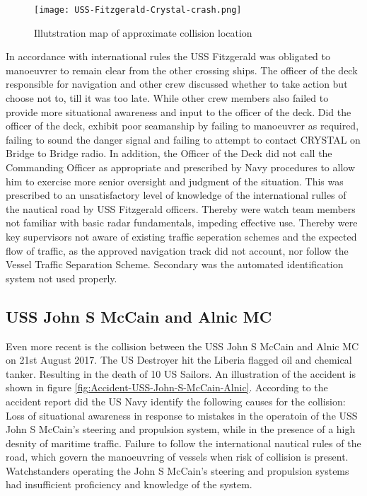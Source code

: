 \begin{figure}[H]
	\centering
	\texttt{[image: USS-Fitzgerald-Crystal-crash.png]}
	\caption{Illutstration map of approximate collision location}
	\label{fig:Accident-USS-Fitzgerald-Crystal}
\end{figure}

In accordance with international rules the USS Fitzgerald was obligated to manoeuvrer to remain clear from the other crossing ships. The officer of the deck responsible for navigation and other crew discussed whether to take action but choose not to, till it was too late. While other crew members also failed to provide more situational awareness and input to the officer of the deck. Did the officer of the deck, exhibit poor seamanship by failing to manoeuvrer as required, failing to sound the danger signal and failing to attempt to contact CRYSTAL on Bridge to Bridge radio. In addition, the Officer of the Deck did not call the Commanding Officer as appropriate and prescribed by Navy procedures to allow him to exercise more senior oversight and judgment of the situation. This was prescribed to an unsatisfactory level of knowledge of the international rulles of the nautical road by USS Fitzgerald officers. Thereby were watch team members not familiar with basic radar fundamentals, impeding effective use. Thereby were key supervisors not aware of existing traffic seperation schemes and the expected flow of traffic, as the approved navigation track did not account, nor follow the Vessel Traffic Separation Scheme. Secondary was the automated identification system not used properly. \cite{USSNavy2017}

\newpage
\subsection{USS John S McCain and Alnic MC}
Even more recent is the collision between the USS John S McCain and Alnic MC on 21st August 2017. The US Destroyer hit the Liberia flagged oil and chemical tanker. Resulting in the death of 10  US Sailors. An illustration of the accident is shown in figure \ref{fig:Accident-USS-John-S-McCain-Alnic}. According to the accident report did the US Navy identify the following causes for the collision: Loss of situational awareness in response to mistakes in the operatoin of the USS John S McCain's steering and propulsion system, while in the presence of a high desnity of maritime traffic. Failure to follow the international nautical rules of the road, which govern the manoeuvring of vessels when risk of collision is present. Watchstanders operating the John S McCain's steering and propulsion systems had insufficient proficiency and knowledge of the system. 

